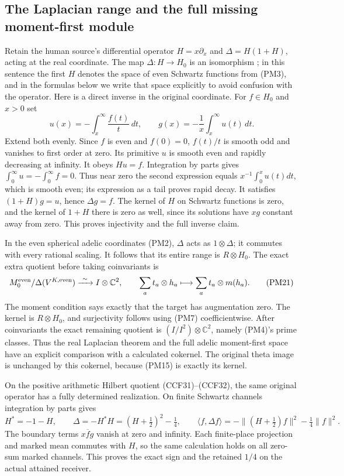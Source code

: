 \subsection{The Laplacian range and the full missing moment-first module}

Retain the human source's differential operator
$H=x\partial_x$ and $\Delta=H(1+H)$, acting at the real
coordinate. The map $\Delta:H\to H_0$ is an isomorphism
\cite[\texttt{quotbruhatschwartz}]{ConnesConsaniHochschild};
in this sentence the first $H$ denotes the space of even
Schwartz functions from (PM3), and in the formulas below we
write that space explicitly to avoid confusion with the operator.
Here is a direct inverse in the original coordinate. For
$f\in H_0$ and $x>0$ set
\[
 u(x)=-\int_x^\infty\frac{f(t)}t\,dt,
 \qquad g(x)=-\frac1x\int_x^\infty u(t)\,dt.
 \tag{PM20}
\]
Extend both evenly. Since $f$ is even and $f(0)=0$,
$f(t)/t$ is smooth odd and vanishes to first order at zero.
Its primitive $u$ is smooth even and rapidly decreasing at
infinity. It obeys $Hu=f$. Integration by parts gives
$\int_0^\infty u=-\int_0^\infty f=0$. Thus near zero the
second expression equals $x^{-1}\int_0^xu(t)dt$, which is
smooth even; its expression as a tail proves rapid decay.
It satisfies $(1+H)g=u$, hence $\Delta g=f$.
The kernel of $H$ on Schwartz functions is zero, and the
kernel of $1+H$ there is zero as well, since its solutions
have $xg$ constant away from zero. This proves injectivity
and the full inverse claim.

In the even spherical adelic coordinates (PM2), $\Delta$
acts as $1\otimes\Delta$; it commutes with every rational
scaling. It follows that its entire range is $R\otimes H_0$.
The exact extra quotient before taking coinvariants is
\[
 M_0^{\rm even}/\Delta(V^{K,\rm even})
       \xrightarrow{\ \sim\ } I\otimes\mathbb C^2,
 \qquad \sum_at_a\otimes h_a\longmapsto
                         \sum_at_a\otimes m(h_a).
 \tag{PM21}
\]
The moment condition says exactly that the target has
augmentation zero. The kernel is $R\otimes H_0$, and
surjectivity follows using (PM7) coefficientwise. After
coinvariants the exact remaining quotient is
$(I/I^2)\otimes\mathbb C^2$, namely (PM4)'s prime classes.
Thus the real Laplacian theorem and the full adelic
moment-first space have an explicit comparison with a
calculated cokernel. The original theta image is unchanged
by this cokernel, because (PM15) is exactly its kernel.

On the positive arithmetic Hilbert quotient (CCF31)--(CCF32),
the same original operator has a fully determined realization.
On finite Schwartz channels integration by parts gives
\[
 H^*=-1-H,\qquad
 \Delta=-H^*H=(H+\tfrac12)^2-\tfrac14,
 \qquad
 \langle f,\Delta f\rangle
       =-\|(H+\tfrac12)f\|^2-\tfrac14\|f\|^2.
 \tag{PM22}
\]
The boundary terms $x\overline f g$ vanish at zero and
infinity. Each finite-place projection and marked mean
commutes with $H$, so the same calculation holds on all
zero-sum marked channels. This proves the exact sign and
the retained $1/4$ on the actual attained receiver.

